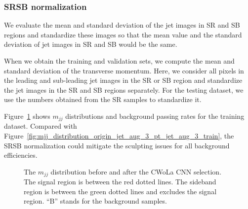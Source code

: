 \documentclass[12pt]{article}
\begin{document}
		\subsubsection{SRSB normalization}%
		\label{subs:srsb_normalization}
			We evaluate the mean and standard deviation of the jet images in SR and SB regions and standardize these images so that the mean value and the standard deviation of jet images in SR and SB would be the same.

			When we obtain the training and validation sets, we compute the mean and standard deviation of the transverse momentum. Here, we consider all pixels in the leading and sub-leading jet images in the SR or SB region and standardize the jet images in the SR and SB regions separately. For the testing dataset, we use the numbers obtained from the SR samples to standardize it.

			Figure~\ref{fig:mjj_distribution_srsb_normalized_origin_train} shows $m_{jj}$ distributions and background passing rates for the training dataset. Compared with Figure~\ref{fig:mjj_distribution_origin_jet_aug_3_pt_jet_aug_3_train}, the SRSB normalization could mitigate the sculpting issues for all background efficiencies.
			\begin{figure}[htpb]
				\centering
				\caption{The $m_{jj}$ distribution before and after the CWoLa CNN selection. The signal region is between the red dotted lines. The sideband region is between the green dotted lines and excludes the signal region. ``B'' stands for the background samples.}
				\label{fig:mjj_distribution_srsb_normalized_origin_train}
			\end{figure}
\end{document}
